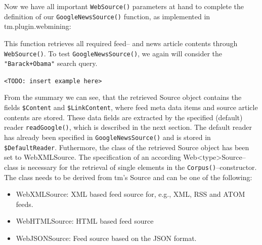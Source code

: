 \documentclass[a4paper]{article}
\newcommand{\class}[1]{\mbox{\textsf{#1}}}
\newcommand{\code}[1]{\mbox{\texttt{#1}}}
\newcommand{\pkg}[1]{{\normalfont\fontseries{b}\selectfont #1}}
\newcommand{\proglang}[1]{\textsf{#1}}
\newcommand{\fkt}[1]{\code{#1()}}
\newcommand{\todo}[1]{\begin{center}\code{<TODO: #1>}\end{center}}
\newcommand{\field}[1]{\code{\$#1}}
\begin{document}
Now we have all important \fkt{WebSource} parameters at hand to complete the definition of our
\fkt{GoogleNewsSource} function, as implemented in \pkg{tm.plugin.webmining}:
\begin{Schunk}
\end{Schunk}
This function retrieves all required feed-- and news article contents through \fkt{WebSource}.
To test \fkt{GoogleNewsSource}, we again will consider the \code{"Barack+Obama"} search query.
\todo{insert example here}
From the summary we can see, that the retrieved \class{Source} object contains the fields
\field{Content} and \field{LinkContent}, where feed meta data items and source article contents are
stored. These data fields are extracted by the specified (default) reader \fkt{readGoogle}, which
is described in the next section. The default reader has already been specified in \fkt{GoogleNewsSource} 
and is stored in \field{DefaultReader}. Futhermore, the class of the retrieved \class{Source} object 
has been set to \class{WebXMLSource}. The specification of an according \class{Web<type>Source}--class
is necessary for the retrieval of single elements in the \fkt{Corpus}--constructor. The class needs
to be derived from \pkg{tm}'s \class{Source} and can be one of the following:
\begin{itemize}
\item \class{WebXMLSource}: \proglang{XML} based feed source for, e.g., \proglang{XML}, \proglang{RSS} 
and \proglang{ATOM} feeds.
\item \class{WebHTMLSource}: \proglang{HTML} based feed source
\item \class{WebJSONSource}: Feed source based on the \proglang{JSON} format.
\end{itemize}
\end{document}
